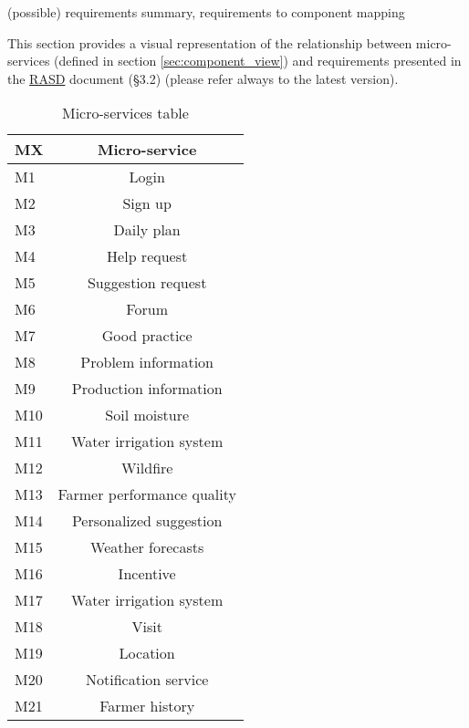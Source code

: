 (possible) requirements summary, requirements to component mapping

This section provides a visual representation of the relationship between micro-services (defined in section \ref{sec:component_view}) and requirements presented in the \href{https://github.com/MarcoRomanini/GoriRomaniniWatanabe/tree/main/DeliveryFolder}{RASD} document (\S 3.2) (please refer always to the latest version).

\begin{table}[H]
    \setlength\arrayrulewidth{1pt}
    \centering
    \begin{tabular}{|l|c|}
        \rowcolor{myblue}
        \hline
        \color{white}MX & \color{white}Micro-service\\
        \hline
        M1      &   Login\\
        \hline
        M2      &   Sign up\\
        \hline
        M3      &   Daily plan\\
        \hline
        M4      &   Help request\\
        \hline
        M5      &   Suggestion request\\
        \hline
        M6      &   Forum\\
        \hline
        M7      &   Good practice\\
        \hline
        M8      &   Problem information\\
        \hline
        M9      &   Production information\\
        \hline
        M10      &   Soil moisture\\
        \hline
        M11      &   Water irrigation system\\
        \hline
        M12      &   Wildfire\\
        \hline
        M13      &   Farmer performance quality\\
        \hline
        M14      &   Personalized suggestion\\
        \hline
        M15      &   Weather forecasts\\
        \hline
        M16      &   Incentive\\
        \hline
        M17      &   Water irrigation system\\
        \hline
        M18     & Visit \\
        \hline
        M19     & Location\\
        \hline
        M20     & Notification service\\
        \hline
        M21     & Farmer history\\
        \hline
    \end{tabular}
    
    \caption{\label{tab:microservices_table}Micro-services table}
    
\end{table}


